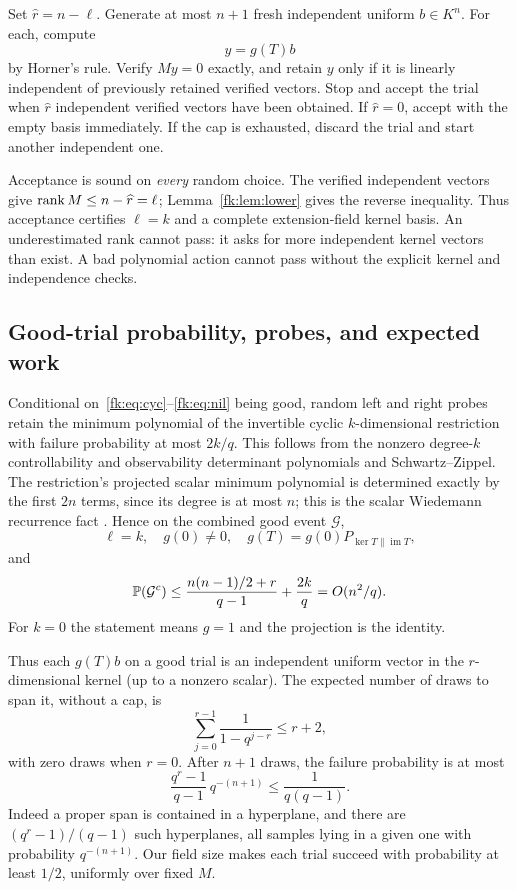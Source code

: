 Set $\widehat r=n-\ell$. Generate at most $n+1$ fresh independent
uniform $b\in K^n$. For each, compute
\[
 y=g(T)b
\]
by Horner's rule. Verify $My=0$ exactly, and retain $y$ only if it
is linearly independent of previously retained verified vectors.
Stop and accept the trial when $\widehat r$ independent verified
vectors have been obtained. If $\widehat r=0$, accept with the empty
basis immediately. If the cap is exhausted, discard the trial and
start another independent one.

Acceptance is sound on \emph{every} random choice. The verified
independent vectors give $\operatorname{rank} M\le n-\widehat r=\ell$;
Lemma~\ref{fk:lem:lower} gives the reverse inequality. Thus acceptance
certifies $\ell=k$ and a complete extension-field kernel basis.
An underestimated rank cannot pass: it asks for more independent
kernel vectors than exist. A bad polynomial action cannot pass
without the explicit kernel and independence checks.

\subsection{Good-trial probability, probes, and expected work}
Conditional on~\eqref{fk:eq:cyc}--\eqref{fk:eq:nil} being good, random
left and right probes retain the minimum polynomial of the invertible
cyclic $k$-dimensional restriction with failure probability at most
$2k/q$. This follows from the nonzero degree-$k$ controllability and
observability determinant polynomials and Schwartz--Zippel.
The restriction's projected scalar minimum polynomial is determined
exactly by the first $2n$ terms, since its degree is at most $n$;
this is the scalar Wiedemann recurrence fact \cite[Section II]{Wiedemann}.
Hence on the combined good event $\mathcal G$,
\[
 \ell=k,\quad g(0)\ne0,\quad
 g(T)=g(0)P_{\ker T\parallel\operatorname{im}T},
\]
and
\begin{equation}\label{fk:eq:bad}
 \mathbb P(\mathcal G^c)
 \le\frac{n(n-1)/2+r}{q-1}+\frac{2k}{q}
 =O(n^2/q).
\end{equation}
For $k=0$ the statement means $g=1$ and the projection is the identity.

Thus each $g(T)b$ on a good trial is an independent uniform vector
in the $r$-dimensional kernel (up to a nonzero scalar).
The expected number of draws to span it, without a cap, is
\[
 \sum_{j=0}^{r-1}\frac1{1-q^{j-r}}\le r+2,
\]
with zero draws when $r=0$.
After $n+1$ draws, the failure probability is at most
\begin{equation}\label{fk:eq:cap}
 \frac{q^r-1}{q-1}\,q^{-(n+1)}
 \le\frac1{q(q-1)}.
\end{equation}
Indeed a proper span is contained in a hyperplane, and there are
$(q^r-1)/(q-1)$ such hyperplanes, all samples lying in a given one with probability
$q^{-(n+1)}$. Our field size makes each trial succeed with
probability at least $1/2$, uniformly over fixed $M$.


